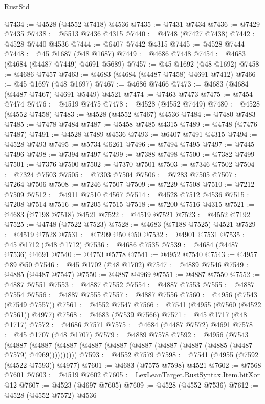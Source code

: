 \begin{lexlean}{RustStd}
\begin{coremodule}
@7434 := @4528 (@4552 @7418) @4536
@7435 := @7431 @7434
@7436 := @7429 @7435
@7438 := @5513 @7436 @4315
@7440 := @4748 (@7427 @7438)
@7442 := @4528 @7440 @4536
@7444 := @6407 @7442 @4315
@7445 := @4528 @7444
@7448 := @45 @1687 (@48 @1687)
@7449 := @4686 @7448
@7454 := @4683 (@4684 (@4487 @7449) @4691 @5689)
@7457 := @45 @1692 (@48 @1692)
@7458 := @4686 @7457
@7463 := @4683 (@4684 (@4487 @7458) @4691 @7412)
@7466 := @45 @1697 (@48 @1697)
@7467 := @4686 @7466
@7473 := @4683 (@4684 (@4487 @7467) @4691 @5449) @4521
@7474 := @7463 @7473
@7475 := @7454 @7474
@7476 := @4519 @7475
@7478 := @4528 (@4552 @7449)
@7480 := @4528 (@4552 @7458)
@7483 := @4528 (@4552 @7467) @4536
@7484 := @7480 @7483
@7485 := @7478 @7484
@7487 := @5458 @7485 @4315
@7489 := @4748 (@7476 @7487)
@7491 := @4528 @7489 @4536
@7493 := @6407 @7491 @4315
@7494 := @4528 @7493
@7495 := @5734 @6261
@7496 := @7494 @7495
@7497 := @7445 @7496
@7498 := @7394 @7497
@7499 := @7388 @7498
@7500 := @7382 @7499
@7501 := @7376 @7500
@7502 := @7370 @7501
@7503 := @7346 @7502
@7504 := @7324 @7503
@7505 := @7303 @7504
@7506 := @7283 @7505
@7507 := @7264 @7506
@7508 := @7246 @7507
@7509 := @7229 @7508
@7510 := @7212 @7509
@7512 := @4911 @7510 @4567
@7514 := @4528 @7512 @4536
@7515 := @7208 @7514
@7516 := @7205 @7515
@7518 := @7200 @7516 @4315
@7521 := @4683 (@7198 @7518) @4521
@7522 := @4519 @7521
@7523 := @4552 @7192
@7525 := @4748 (@7522 @7523)
@7528 := @4683 (@7188 @7525) @4521
@7529 := @4519 @7528
@7531 := @7209 @50 @50
@7532 := @4901 @7531
@7535 := @45 @1712 (@48 @1712)
@7536 := @4686 @7535
@7539 := @4684 (@4487 @7536) @4691
@7540 := @4753 @5778
@7541 := @4952 @7540
@7543 := @4957 @89 @50
@7546 := @45 @1702 (@48 @1702)
@7547 := @4889 @7546
@7549 := @4885 (@4487 @7547)
@7550 := @4887 @4969
@7551 := @4887 @7550
@7552 := @4887 @7551
@7553 := @4887 @7552
@7554 := @4887 @7553
@7555 := @4887 @7554
@7556 := @4887 @7555
@7557 := @4887 @7556
@7560 := @4956 (@7543 (@7549 @7557))
@7561 := @4552 @7547
@7566 := @7541 (@4955 (@7560 (@4522 @7561)) @4977)
@7568 := @4683 (@7539 @7566)
@7571 := @45 @1717 (@48 @1717)
@7572 := @4686 @7571
@7575 := @4684 (@4487 @7572) @4691
@7578 := @45 @1707 (@48 @1707)
@7579 := @4889 @7578
@7592 := @4956
    (@7543
      (@4887 (@4887 (@4887 (@4887 (@4887 (@4887 (@4887 (@4887 (@4885 (@4487 @7579) @4969))))))))))
@7593 := @4552 @7579
@7598 := @7541 (@4955 (@7592 (@4522 @7593)) @4977)
@7601 := @4683 (@7575 @7598) @4521
@7602 := @7568 @7601
@7603 := @4519 @7602
@7605 := LexLeanTarget.RustSyntax.Item.bitXor @12
@7607 := @4523 (@4697 @7605)
@7609 := @4528 (@4552 @7536)
@7612 := @4528 (@4552 @7572) @4536

\end{coremodule}
\end{lexlean}
